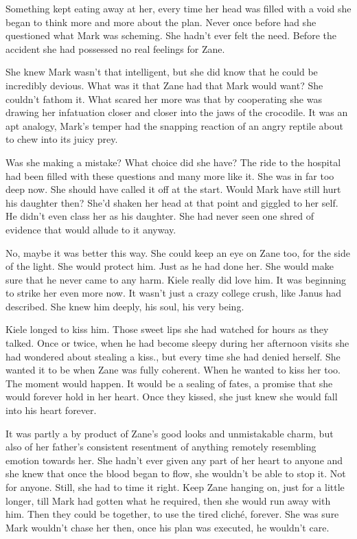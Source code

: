 Something kept eating away at her, every time her head was filled with a void she began to think more and more about the plan.  Never once before had she questioned what Mark was scheming.  She hadn't ever felt the need.  Before the accident she had possessed no real feelings for Zane.  

She knew Mark wasn't that intelligent, but she did know that he could be incredibly devious.  What was it that Zane had that Mark would want?  She couldn't fathom it.  What scared her more was that by cooperating she was drawing her infatuation closer and closer into the jaws of the crocodile.  It was an apt analogy, Mark's temper had the snapping reaction of an angry reptile about to chew into its juicy prey.

Was she making a mistake?  What choice did she have?  The ride to the hospital had been filled with these questions and many more like it.  She was in far too deep now.  She should have called it off at the start.  Would Mark have still hurt his daughter then?  She'd shaken her head at that point and giggled to her self.  He didn't even class her as his daughter.  She had never seen one shred of evidence that would allude to it anyway.

No, maybe it was better this way.  She could keep an eye on Zane too, for the side of the light.  She would protect him.  Just as he had done her.  She would make sure that he never came to any harm.  Kiele really did love him.  It was beginning to strike her even more now.  It wasn't just a crazy college crush, like Janus had described.  She knew him deeply, his soul, his very being.

Kiele longed to kiss him.  Those sweet lips she had watched for hours as they talked.  Once or twice, when he had become sleepy during her afternoon visits she had wondered about stealing a kiss., but every time she had denied herself.  She wanted it to be when Zane was fully coherent.  When he wanted to kiss her too.  The moment would happen.  It would be a sealing of fates, a promise that she would forever hold in her heart.  Once they kissed, she just knew she would fall into his heart forever.  

It was partly a by product of Zane's good looks and unmistakable charm, but also of her father's consistent resentment of anything remotely resembling emotion towards her.  She hadn't ever given any part of her heart to anyone and she knew that once the blood began to flow, she wouldn't be able to stop it.  Not for anyone.  Still, she had to time it right.  Keep Zane hanging on, just for a little longer, till Mark had gotten what he required, then she would run away with him.  Then they could be together, to use the tired cliché, forever.  She was sure Mark wouldn't chase her then, once his plan was executed, he wouldn't care.

